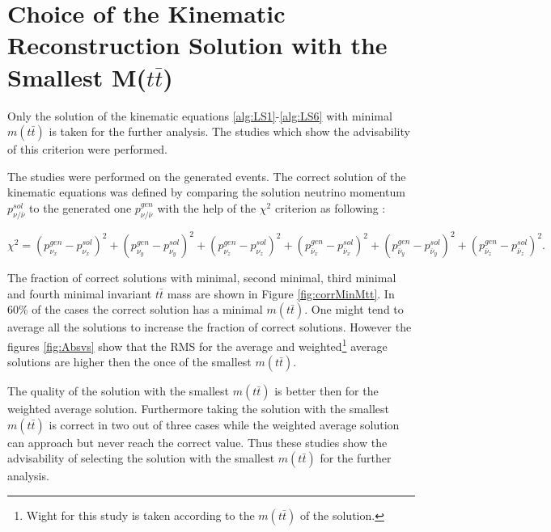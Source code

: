 \chapter{Choice of the Kinematic Reconstruction Solution with the Smallest M($t\bar{t}$)}\label{appendix:mtt}

Only the solution of the kinematic equations \ref{alg:LS1}-\ref{alg:LS6} with minimal $m(t\bar{t})$ is taken for the further analysis.
The studies which show the advisability of this criterion were performed.

The studies were performed on the generated events. The correct solution of the kinematic equations was defined by comparing the 
solution neutrino momentum $p_{\nu/\bar{\nu}}^{sol}$ to the generated one $p_{\nu/\bar{\nu}}^{gen}$ with the help of the $\chi^{2}$ criterion as following \cite{Sonnenschein:2005ed}:

\begin{equation}
 \chi^{2} = (p_{\nu_{x}}^{gen} - p_{\nu_{x}}^{sol})^{2} + (p_{\nu_{y}}^{gen} - p_{\nu_{y}}^{sol})^{2} + (p_{\nu_{z}}^{gen} - p_{\nu_{z}}^{sol})^{2} + (p_{\bar{\nu}_{x}}^{gen} - p_{\bar{\nu}_{x}}^{sol})^{2} +
 (p_{\bar{\nu}_{y}}^{gen} - p_{\bar{\nu}_{y}}^{sol})^{2} + (p_{\bar{\nu}_{z}}^{gen} - p_{\bar{\nu}_{z}}^{sol})^{2}.
\end{equation}

The fraction of correct solutions with minimal, second minimal, third minimal and fourth minimal invariant $t\bar{t}$ mass are shown in Figure \ref{fig:corrMinMtt}. In $60\%$ of 
the cases the correct solution has a minimal $m(t\bar{t})$. One might tend to average all the solutions to increase the fraction of correct solutions. However the figures \ref{fig:Absvs}
show that the RMS for the average and weighted\footnote{Wight for this study is taken according to the $m(t\bar{t})$ of the solution.} average solutions are higher then the once
of the smallest $m(t\bar{t})$.

The quality of the solution with the smallest $m(t\bar{t})$ is better then for the weighted average solution. Furthermore taking the solution with the smallest $m(t\bar{t})$ is
correct in two out of three cases while the weighted average solution can approach but never reach the correct value. Thus these studies show the advisability of selecting the
solution with the smallest $m(t\bar{t})$ for the further analysis.

